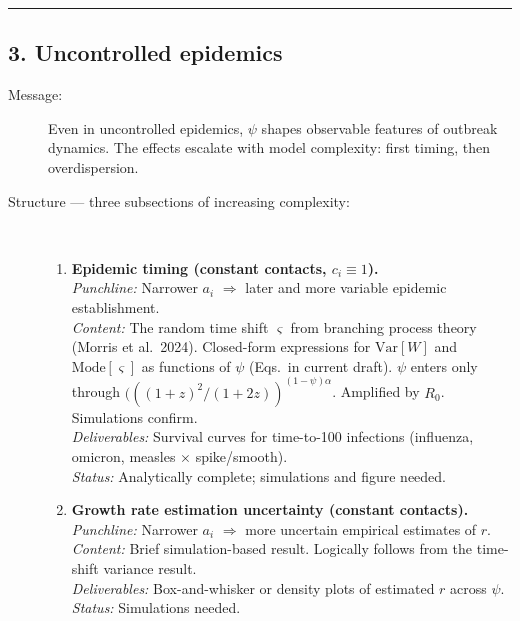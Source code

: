 \noindent\rule{\textwidth}{0.4pt}

\subsection*{3. Uncontrolled epidemics}

\begin{description}
    \item[Message:] Even in uncontrolled epidemics, $\psi$ shapes observable features of outbreak dynamics. The effects escalate with model complexity: first timing, then overdispersion.

    \item[Structure --- three subsections of increasing complexity:]~

    \begin{enumerate}
        \item \textbf{Epidemic timing (constant contacts, $c_i \equiv 1$).} \\
        \textit{Punchline:} Narrower $a_i$ $\Rightarrow$ later and more variable epidemic establishment. \\
        \textit{Content:} The random time shift $\varsigma$ from branching process theory (Morris et al.\ 2024). Closed-form expressions for $\text{Var}[W]$ and $\text{Mode}[\varsigma]$ as functions of $\psi$ (Eqs.\ in current draft). $\psi$ enters only through $(({(1+z)^2}/({1+2z}))^{(1-\psi)\alpha}$. Amplified by $R_0$. Simulations confirm. \\
        \textit{Deliverables:} Survival curves for time-to-100 infections (influenza, omicron, measles $\times$ spike/smooth). \\
        \textit{Status:} Analytically complete; simulations and figure needed.

        \item \textbf{Growth rate estimation uncertainty (constant contacts).} \\
        \textit{Punchline:} Narrower $a_i$ $\Rightarrow$ more uncertain empirical estimates of $r$. \\
        \textit{Content:} Brief simulation-based result. Logically follows from the time-shift variance result. \\
        \textit{Deliverables:} Box-and-whisker or density plots of estimated $r$ across $\psi$. \\
        \textit{Status:} Simulations needed.


\end{enumerate}
\end{description}
